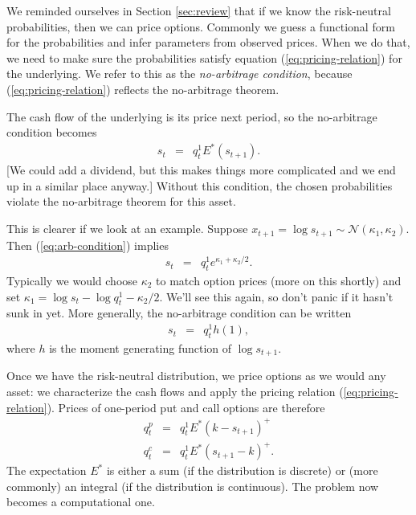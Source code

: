\documentclass[11pt]{article}
\begin{document}
We reminded ourselves in Section \ref{sec:review} that
if we know the risk-neutral probabilities, then we can price options.
Commonly we guess a functional form for the probabilities
and infer parameters from observed prices.
When we do that, we need to make sure the probabilities satisfy
equation (\ref{eq:pricing-relation}) for the underlying.
We refer to this as the {\it no-arbitrage condition\/},
because (\ref{eq:pricing-relation}) reflects the no-arbitrage theorem.


The cash flow of the underlying is its price next period,
so the no-arbitrage condition becomes
\begin{eqnarray}
    s_t  &=&  q^1_t  E^* (s_{t+1}) .
    \label{eq:arb-condition}
\end{eqnarray}
[We could add a dividend, but this makes things more complicated
and we end up in a similar place anyway.]
Without this condition,
the chosen probabilities violate the no-arbitrage theorem for this asset.

This is clearer if we look at an example.
Suppose $x_{t+1} = \log s_{t+1} \sim \mathcal{N} (\kappa_1,\kappa_2)$.
Then (\ref{eq:arb-condition}) implies
\begin{eqnarray}
    s_t &=& q^1_t e^{\kappa_1 + \kappa_2/2}.
    \label{eq:bsm-no-arb}
\end{eqnarray}
Typically we would choose $\kappa_2$ to match option prices
(more on this shortly)
and set $\kappa_1 = \log s_t -\log q_t^1 - \kappa_2/2$.
We'll see this again, so don't panic if it hasn't sunk in yet.
More generally, the no-arbitrage condition can be written
\begin{eqnarray*}
    s_t &=& q^1_t h(1) , %
\end{eqnarray*}
where $h$ is the moment generating function of $\log s_{t+1}$.

Once we have the risk-neutral distribution,
we price options as we would any asset:
we characterize the cash flows and apply the pricing relation
(\ref{eq:pricing-relation}).
Prices of one-period put and call options are therefore
\begin{eqnarray*}
        q^p_t &=&  q_t^1 E^* (k-s_{t+1})^+  \\
        q^c_t &=&  q_t^1 E^* (s_{t+1}-k)^+ .
\end{eqnarray*}
The expectation $E^*$ is either a sum (if the distribution is discrete)
or (more commonly) an integral (if the distribution is continuous).
The problem now becomes a computational one.
\end{document}
